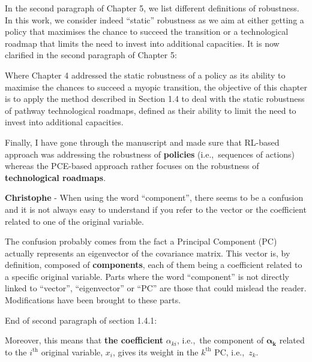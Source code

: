 \documentclass[12pt,a4paper]{article}
\def\ie{i.e.,\ }
\begin{document}
In the second paragraph of Chapter 5, we list different definitions of robustness. In this work, we consider indeed ``static'' robustness as we aim at either getting a policy that maximises the chance to succeed the transition or a technological roadmap that limits the need to invest into additional capacities. It is now clarified {\color{blue}in the second paragraph of Chapter 5}:

\begin{mdframed}[style=manuscript] %
Where Chapter 4 addressed the static robustness of a policy as its ability to maximise the chances to succeed a myopic transition, the objective of this chapter is to apply the method described in Section 1.4 to deal with the static robustness of pathway technological roadmaps, defined as their ability to limit the need to invest into additional capacities.
\end{mdframed}

Finally, I have gone through the manuscript and made sure that RL-based approach was addressing the robustness of \textbf{policies} (\ie sequences of actions) whereas the PCE-based approach rather focuses on the robustness of \textbf{technological roadmaps}. 

\begin{mdframed}[style=comment] %
{\color{violet} \textbf{Christophe}} - When using the word ``component'', there seems to be a confusion and it is not always easy to understand if you refer to the vector or the coefficient related to one of the original variable.
\end{mdframed}

\noindent The confusion probably comes from the fact a Principal Component (PC) actually represents an eigenvector of the covariance matrix. This vector is, by definition, composed of \textbf{components}, each of them being a coefficient related to a specific original variable. Parts where the word ``component'' is not directly linked to ``vector'', ``eigenvector'' or ``PC'' are those that could mislead the reader. Modifications have been brought to these parts.

{\color{blue} End of second paragraph of section 1.4.1}:

\begin{mdframed}[style=manuscript] %
Moreover, this means that \textbf{the coefficient} $\alpha_{ki}$, \ie the component of $\bm{\alpha}_{\mathbf{k}}$ related to the $i^{\text{th}}$ original variable, $x_i$,  gives its weight in the $k^{\text{th}}$ PC, \ie $z_k$. 
\end{mdframed}
\end{document}
